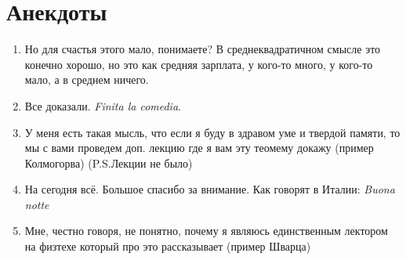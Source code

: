 \newpage
\section{Анекдоты}
\begin{enumerate}
	\item Но для счастья этого мало, понимаете? В среднеквадратичном смысле это конечно хорошо, но это как средняя зарплата, у кого-то много, у кого-то мало, а в среднем ничего.

	\item Все доказали. \textit{Finita la comedia}.

	\item У меня есть такая мысль, что если я буду в здравом уме и твердой памяти, то мы с вами проведем доп. лекцию где я вам эту теомему докажу (пример Колмогорва) (P.S.Лекции не было)

	\item На сегодня всё. Большое спасибо за внимание. Как говорят в Италии: \textit{Buona notte}

	\item Мне, честно говоря, не понятно, почему я являюсь единственным лектором на физтехе который про это рассказывает (пример Шварца)
\end{enumerate}